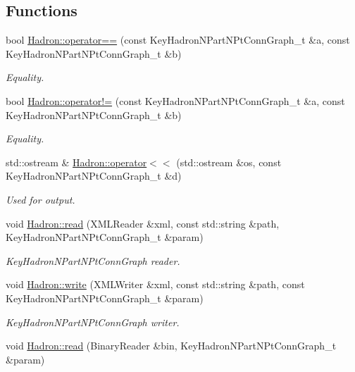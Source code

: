 \subsection*{Functions}
\begin{DoxyCompactItemize}
\item 
bool \mbox{\hyperlink{namespaceHadron_ac884c28242a0aaf83a23169ef8ff5b2b}{Hadron\+::operator==}} (const Key\+Hadron\+N\+Part\+N\+Pt\+Conn\+Graph\+\_\+t \&a, const Key\+Hadron\+N\+Part\+N\+Pt\+Conn\+Graph\+\_\+t \&b)
\begin{DoxyCompactList}\small\item\em Equality. \end{DoxyCompactList}\item 
bool \mbox{\hyperlink{namespaceHadron_aa8d535bf12152ca7f5f44d089e5db4b1}{Hadron\+::operator!=}} (const Key\+Hadron\+N\+Part\+N\+Pt\+Conn\+Graph\+\_\+t \&a, const Key\+Hadron\+N\+Part\+N\+Pt\+Conn\+Graph\+\_\+t \&b)
\begin{DoxyCompactList}\small\item\em Equality. \end{DoxyCompactList}\item 
std\+::ostream \& \mbox{\hyperlink{namespaceHadron_a6447e57d6b19af925c635187757e2f02}{Hadron\+::operator$<$$<$}} (std\+::ostream \&os, const Key\+Hadron\+N\+Part\+N\+Pt\+Conn\+Graph\+\_\+t \&d)
\begin{DoxyCompactList}\small\item\em Used for output. \end{DoxyCompactList}\item 
void \mbox{\hyperlink{namespaceHadron_a3250f56af4c72ab50d162f878b999c09}{Hadron\+::read}} (X\+M\+L\+Reader \&xml, const std\+::string \&path, Key\+Hadron\+N\+Part\+N\+Pt\+Conn\+Graph\+\_\+t \&param)
\begin{DoxyCompactList}\small\item\em Key\+Hadron\+N\+Part\+N\+Pt\+Conn\+Graph reader. \end{DoxyCompactList}\item 
void \mbox{\hyperlink{namespaceHadron_a25da56def6a3cbbe579c9b7b4d27e848}{Hadron\+::write}} (X\+M\+L\+Writer \&xml, const std\+::string \&path, const Key\+Hadron\+N\+Part\+N\+Pt\+Conn\+Graph\+\_\+t \&param)
\begin{DoxyCompactList}\small\item\em Key\+Hadron\+N\+Part\+N\+Pt\+Conn\+Graph writer. \end{DoxyCompactList}\item 
void \mbox{\hyperlink{namespaceHadron_a5b83c233560cd9c25b2793cb89778c6d}{Hadron\+::read}} (Binary\+Reader \&bin, Key\+Hadron\+N\+Part\+N\+Pt\+Conn\+Graph\+\_\+t \&param)

\end{DoxyCompactItemize}
